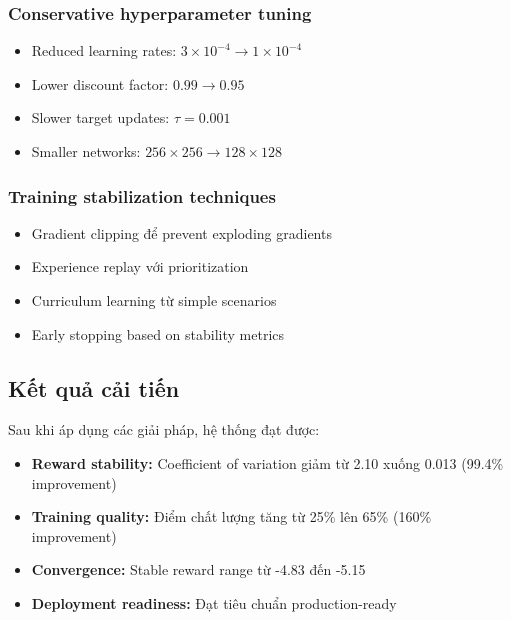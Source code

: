 \subsubsection{Conservative hyperparameter tuning}
\begin{itemize}
    \item Reduced learning rates: $3 \times 10^{-4}\rightarrow 1 \times 10^{-4}$

    \item Lower discount factor: $0.99 \rightarrow 0.95$

    \item Slower target updates: $\tau = 0.001$

    \item Smaller networks: $256 \times 256 \rightarrow 128 \times 128$
\end{itemize}

\subsubsection{Training stabilization techniques}
\begin{itemize}
    \item Gradient clipping để prevent exploding gradients

    \item Experience replay với prioritization

    \item Curriculum learning từ simple scenarios

    \item Early stopping based on stability metrics
\end{itemize}

\subsection{Kết quả cải tiến}
Sau khi áp dụng các giải pháp, hệ thống đạt được:
\begin{itemize}
    \item \textbf{Reward stability:} Coefficient of variation giảm từ 2.10 xuống
        0.013 (99.4\% improvement)

    \item \textbf{Training quality:} Điểm chất lượng tăng từ 25\% lên 65\% (160\%
        improvement)

    \item \textbf{Convergence:} Stable reward range từ -4.83 đến -5.15

    \item \textbf{Deployment readiness:} Đạt tiêu chuẩn production-ready
\end{itemize}